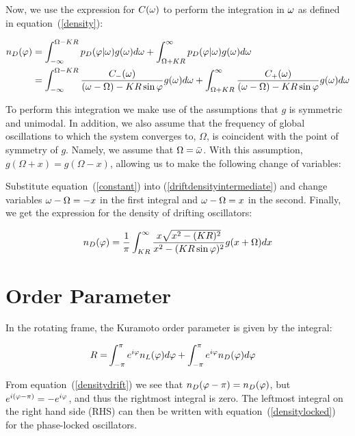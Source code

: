 Now, we use the expression for $C(\omega)$ to perform the integration in $\omega$ as defined in equation~(\ref{density}):

\begin{align}
    n_D(\varphi) &= \int_{-\infty}^{\Omega - K R} p_D(\varphi | \omega)g(\omega)d\omega +
                      \int_{\Omega + K R}^{\infty} p_D(\varphi | \omega)g(\omega)d\omega \notag\\
                   &= \int_{-\infty}^{\Omega - K R} \frac{C_-(\omega)}{(\omega - \Omega) - K R\sin\varphi}g(\omega)d\omega +
                      \int_{\Omega + K R}^{\infty} \frac{C_+(\omega)}{(\omega - \Omega) - K R\sin\varphi}g(\omega)d\omega
                      \label{driftdensityintermediate}
\end{align}

To perform this integration we make use of the assumptions that $g$ is symmetric and unimodal. In addition, we also assume that the
frequency of global oscillations to which the system converges to, $\Omega$, is coincident with the point of symmetry of $g$. Namely,
we assume that $\Omega = \bar{\omega}$. With this assumption, $g(\Omega + x) = g(\Omega - x)$, allowing us to make the following change
of variables:

Substitute equation~(\ref{constant}) into (\ref{driftdensityintermediate}) and change variables $\omega -
\Omega = -x$ in the first integral and $\omega - \Omega = x$ in the second. Finally, we get the expression for the density of drifting
oscillators:

\begin{align}
    n_D(\varphi) = \frac{1}{\pi}\int_{K R}^\infty \frac{x\sqrt{x^2 - (K R)^2}}{x^2 - (K R\sin\varphi)^2}g(x+\Omega)dx
    \label{densitydrift}
\end{align}


\section{Order Parameter}


In the rotating frame, the Kuramoto order parameter is given by the integral:

\begin{align}
    R = &\int_{-\pi}^{\pi} e^{i\varphi}n_L(\varphi)d\varphi + \int_{-\pi}^{\pi} e^{i\varphi}n_D(\varphi)d\varphi
\end{align}

From equation~(\ref{densitydrift}) we see that $n_D(\varphi - \pi) = n_D(\varphi)$, but $e^{i(\varphi - \pi)} = -e^{i\varphi}$,
and thus the rightmost integral is zero. The leftmost integral on the right hand side (RHS) can then be written with
equation~(\ref{densitylocked}) for the phase-locked oscillators.

